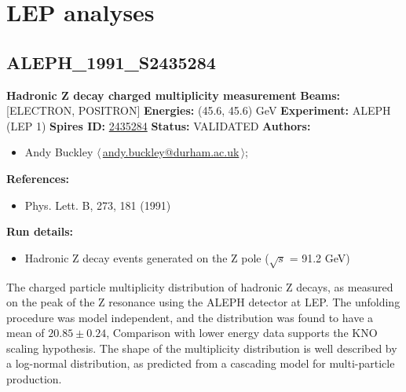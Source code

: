 \makeatletter
\renewcommand{\d}[1]{\ensuremath{\mathrm{#1}}}
\let\old@eta\eta
\renewcommand{\eta}{\ensuremath{\old@eta}\xspace}
\let\old@phi\phi
\renewcommand{\phi}{\ensuremath{\old@phi}\xspace}
\providecommand{\pT}{\ensuremath{p_\perp}\xspace}
\providecommand{\pTmin}{\ensuremath{p_\perp^\text{min}}\xspace}
\makeatother

\section{LEP analyses}\subsection[ALEPH\_1991\_S2435284]{ALEPH\_1991\_S2435284\,\cite{Decamp:1991uz}}
\textbf{Hadronic Z decay charged multiplicity measurement}\newline
\textbf{Beams:} [ELECTRON, POSITRON] \newline
\textbf{Energies:} (45.6, 45.6) GeV \newline
\textbf{Experiment:} ALEPH (LEP 1) \newline
\textbf{Spires ID:} \href{http://www.slac.stanford.edu/spires/find/hep/www?rawcmd=key+2435284}{2435284}\newline
\textbf{Status:} VALIDATED\newline
\textbf{Authors:}
\begin{itemize}
  \item Andy Buckley $\langle\,$\href{mailto:andy.buckley@durham.ac.uk}{andy.buckley@durham.ac.uk}$\,\rangle$;
\end{itemize}
\textbf{References:}
\begin{itemize}
  \item Phys. Lett. B, 273, 181 (1991)
\end{itemize}
\textbf{Run details:}
\begin{itemize}

  \item Hadronic Z decay events generated on the Z pole (\ensuremath{\sqrt{s}} = 91.2 GeV)\end{itemize}

\noindent The charged particle multiplicity distribution of hadronic Z decays, as measured on the peak of the Z resonance using the ALEPH detector at LEP. The unfolding procedure was model independent, and the distribution was found to have a mean of $20.85 \pm 0.24$, Comparison with lower energy data supports the KNO scaling hypothesis. The shape of the multiplicity distribution is well described by a log-normal distribution, as predicted from a cascading model for multi-particle production.

